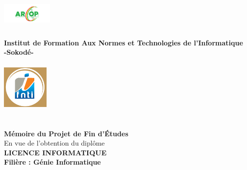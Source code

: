 
\begin{titlepage}
\begin{center}
	\begin{minipage}{2.5cm}
	\begin{center}
		\includegraphics[width=2.5cm,height=1.7cm]{images/logo/logo-arcop.png}
		
	\end{center}
\end{minipage}\hfill
\begin{minipage}{10cm}
	\begin{center}
	\textbf{ Institut de Formation Aux Normes et Technologies de l'Informatique}\\[0.1cm]
    \textbf{-Sokodé-}
		
	\end{center}
\end{minipage}\hfill
\begin{minipage}{2.5cm}
	\begin{center}
		\includegraphics[width=2.3cm,height=2.5cm]{images/logo/logo-ifnti.png}
	\end{center}

\end{minipage}
\textsc{\Large }\\[1.5cm]
{\large \bfseries Mémoire du Projet de Fin d'\uppercase{é}tudes}\\[0.5cm]
{\large En vue de l'obtention du diplôme}\\[1cm]

{\huge \bfseries \uppercase{Licence Informatique} \\[0.5cm] }
{\large \bfseries Filière : Génie Informatique}
\textsc{\Large }\\[1cm]


\end{center}
\end{titlepage}

